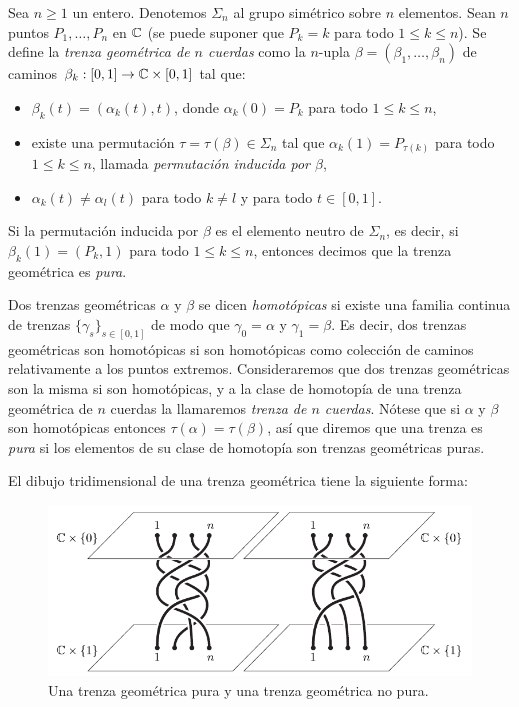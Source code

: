 \documentclass[TFG.tex]{subfiles}
\begin{document}
\begin{defi}\label{geo}
Sea $n\geq 1$ un entero. Denotemos $\Sigma_n$ al grupo simétrico sobre $n$ elementos. Sean $n$ puntos $P_1,\dots, P_n$ en $\mathbb{C}$ (se puede suponer que $P_k=k$ para todo $1\leq k\leq n$). Se define la \emph{trenza geométrica de $n$ cuerdas} como la $n$-upla $\beta=(\beta_1,\dots,\beta_n)$ de caminos $\beta_k:[0,1]\to\mathbb{C}\times[0,1]$ tal que:
\begin{itemize}
\item $\beta_k(t)=(\alpha_k(t),t)$, donde $\alpha_k(0)=P_k$ para todo $1\leq k\leq n$, 
\item existe una permutación $\tau=\tau(\beta)\in\Sigma_n$ tal que $\alpha_k(1)=P_{\tau(k)}$ para todo $1\leq k\leq n$, llamada \emph{permutación inducida por $\beta$},
\item $\alpha_k(t)\neq \alpha_l(t)$ para todo $k\neq l$ y para todo $t\in[0,1]$.
\end{itemize}
Si la permutación inducida por $\beta$ es el elemento neutro de $\Sigma_n$, es decir, si $\beta_k(1)=(P_k,1)$ para todo $1\leq k\leq n$, entonces decimos que la trenza geométrica es \emph{pura}.

Dos trenzas geométricas $\alpha$ y $\beta$ se dicen \emph{homotópicas} si existe una familia continua de trenzas $\{\gamma_s\}_{s\in[0,1]}$ de modo que $\gamma_0=\alpha$ y $\gamma_1=\beta$. Es decir, dos trenzas geométricas son homotópicas si son homotópicas como colección de caminos relativamente a los puntos extremos. Consideraremos que dos trenzas geométricas son la misma si son homotópicas, y a la clase de homotopía de una trenza geométrica de $n$ cuerdas la llamaremos \emph{trenza de $n$ cuerdas}. Nótese que si $\alpha$ y $\beta$ son homotópicas entonces $\tau(\alpha)=\tau(\beta)$, así que diremos que una trenza es \emph{pura} si los elementos de su clase de homotopía son trenzas geométricas puras.
\end{defi}

El dibujo tridimensional de una trenza geométrica tiene la siguiente forma:
\begin{figure}[h!]
\includegraphics[scale=0.7]{Imagenes/hilos}
\caption{Una trenza geométrica pura y una trenza geométrica no pura.}\label{hilos}
\end{figure}
\end{document}
